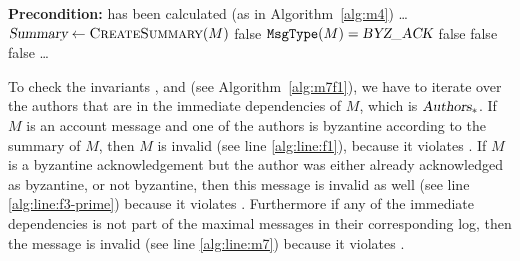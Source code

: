 \begin{algorithm}[ht]
\caption{Code snippet verifying , , , and }
\label{alg:m7f1}
\begin{algorithmic}[1]
    \Statex \textbf{Precondition:}  has been calculated (as in Algorithm~\ref{alg:m4})
    \Statex \ldots \vphantom{I}
    \State $\var{Summary} \gets \Call{CreateSummary}{M}$
             
                \State \Return false
                \label{alg:line:f1}
            \EndIf
        \Else \Comment $\texttt{MsgType}(M) = \textsl{BYZ\_ACK}$
             
                \State \Return false
                \label{alg:line:f3-prime}
            \EndIf
        \EndIf
         
            \label{alg:line:m7}
            \State \Return false
        \EndIf
    \EndFor
     \Comment {}
            \State \Return false
        \EndIf
    \EndIf
    \Statex \ldots \vphantom{I}
\end{algorithmic}
\end{algorithm}
To check the invariants ,  and  (see Algorithm~\ref{alg:m7f1}), we have to iterate over the authors that are in the immediate dependencies of $M$, which is $\textsl{Authors}_*$. If $M$ is an account message and one of the authors is byzantine according to the summary of $M$, then $M$ is invalid (see line \ref{alg:line:f1}), because it violates .
If $M$ is a byzantine acknowledgement but the author was either already acknowledged as byzantine, or not byzantine, then this message is invalid as well (see line \ref{alg:line:f3-prime}) because it violates .
Furthermore if any of the immediate dependencies is not part of the maximal messages in their corresponding log, then the message is invalid (see line \ref{alg:line:m7}) because it violates .

